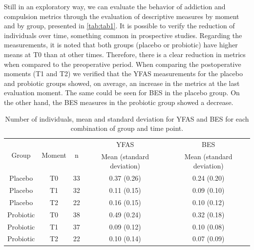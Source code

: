 \documentclass[AMA,STIX1COL]{WileyNJD-v2}
\begin{document}
Still in an exploratory way, we can evaluate the behavior of addiction and compulsion metrics through the evaluation of descriptive measures by moment and by group, presented in \autoref{tab:tab1}. It is possible to verify the reduction of individuals over time, something common in prospective studies. Regarding the measurements, it is noted that both groups (placebo or probiotic) have higher means at T0 than at other times. Therefore, there is a clear reduction in metrics when compared to the preoperative period. When comparing the postoperative moments (T1 and T2) we verified that the YFAS measurements for the placebo and probiotic groups showed, on average, an increase in the metrics at the last evaluation moment. The same could be seen for BES in the placebo group. On the other hand, the BES measures in the probiotic group showed a decrease.

\begin{table}[h]
\centering
\begin{tabular}{ccccc}
\hline
\multirow{2}{*}{Group} & \multirow{2}{*}{Moment}  & \multirow{2}{*}{n} & YFAS                  & BES                   \\ \cline{4-5} 
                       &                          &                    & Mean (standard deviation) & Mean (standard deviation) \\ \hline
Placebo                & T0                       & 33                 & 0.37 (0.26)           & 0.24 (0.20)           \\
Placebo                & T1                       & 32                 & 0.11 (0.15)           & 0.09 (0.10)           \\
Placebo                & T2                       & 22                 & 0.16 (0.15)           & 0.10 (0.12)           \\
Probiotic              & T0                       & 38                 & 0.49 (0.24)           & 0.32 (0.18)           \\
Probiotic              & T1                       & 37                 & 0.09 (0.12)           & 0.10 (0.08)           \\
Probiotic              & T2                       & 22                 & 0.10 (0.14)           & 0.07 (0.09)           \\ \hline
\end{tabular}
\caption{Number of individuals, mean and standard deviation for YFAS and BES for each combination of group and time point.}
\label{tab:tab1}
\end{table}
\end{document}
